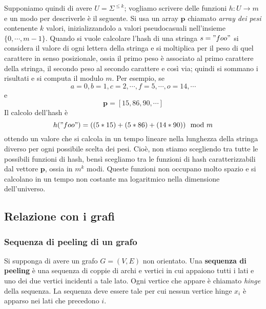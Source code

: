 Supponiamo quindi di avere $U = \Sigma^{\leq k}$; vogliamo scrivere delle
funzioni $h: U \rightarrow m$ e un modo per descriverle è il seguente.
Si usa un array $\mathbf{p}$ chiamato \textit{array dei pesi} contenente $k$ valori,
inizializzandolo a valori pseudocasuali nell'insieme $\{0, \cdots, m-1\}$.
Quando si vuole calcolare l'hash di una stringa $s = "foo"$ si considera il valore
di ogni lettera della stringa e si moltiplica per il peso di quel carattere
in senso posizionale, ossia il primo peso è associato al primo carattere della stringa,
il secondo peso al secondo carattere e così via; quindi si sommano i risultati e
si computa il modulo $m$. Per esempio, se
$$
	a = 0, b = 1, c = 2, \cdots, f = 5, \cdots, o = 14, \cdots
$$
e
$$
	\mathbf{p} = [15, 86, 90, \cdots]
$$
Il calcolo dell'hash è
$$
	h("foo") = ((5 * 15) + (5 * 86) + (14*90)) \mod m
$$
ottendo un valore che si calcola in un tempo lineare nella lunghezza della stringa
diverso per ogni possibile scelta dei pesi. Cioè, non stiamo
scegliendo tra tutte le possibili funzioni di hash, bensì scegliamo tra le funzioni
di hash caratterizzabili dal vettore $\mathbf{p}$, ossia in $m^k$ modi.
Queste funzioni non occupano molto spazio e si calcolano in un tempo non
costante ma logaritmico nella dimensione dell'universo.

\subsection{Relazione con i grafi}
\subsubsection{Sequenza di peeling di un grafo}
Si supponga di avere un grafo $G = (V,E)$ non orientato. Una \textbf{sequenza di peeling} è
una sequenza di coppie di archi e vertici in cui appaiono tutti i lati e uno dei
due vertici incidenti a tale lato. Ogni vertice che appare è chiamato \textit{hinge}
della sequenza. La sequenza deve essere tale per cui nessun vertice hinge $x_i$
è apparso nei lati che precedono $i$.

